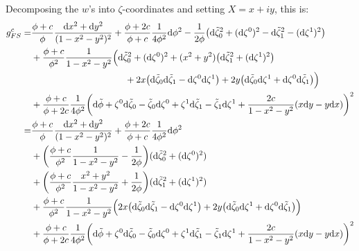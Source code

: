 Decomposing the $w$'s into $\zeta$-coordinates and setting $X=x+iy$, this is:
\begin{align*}
	g_{FS}^c=&\frac{\phi+c}{\phi}\frac{\d x^2+\d y^2}{(1-x^2-y^2)^2} 
	+ \frac{\phi+2c}{\phi+c}\frac{1}{4\phi^2}\d \phi^2
	-\frac{1}{2\phi} \big(\d \tilde\zeta_0^2+ (\d \zeta^0)^2 - \d \tilde \zeta_1^2 - (\d \zeta^1)^2\big)\\
	&+\frac{\phi+c}{\phi^2}\frac{1}{1-x^2-y^2}\Big(\d \tilde\zeta_0^2+(\d \zeta^0)^2
	+(x^2+y^2)\big(\d \tilde\zeta_1^2+(\d \zeta^1)^2\big)\\
	&\hspace{3.6cm}+2x \big(\d \tilde\zeta_0\d \tilde\zeta_1 - \d \zeta^0 \d \zeta^1 \big) 
	+2y \big(\d \tilde\zeta_0 \d \zeta^1 + \d \zeta^0\d \tilde\zeta_1 \big) \Big)\\
	&+\frac{\phi+c}{\phi+2c}\frac{1}{4\phi^2}\bigg(\d \tilde{\phi}+\zeta^0 \d \tilde{\zeta}_0 -\tilde{\zeta}_0 \d \zeta^0
	+\zeta^1 \d \tilde{\zeta}_1 -\tilde{\zeta}_1 \d \zeta^1+\frac{2c}{1-x^2-y^2}(x\d y-y \d x)\bigg)^2\\
	=&\frac{\phi+c}{\phi}\frac{\d x^2+\d y^2}{(1-x^2-y^2)^2} 
	+ \frac{\phi+2c}{\phi+c}\frac{1}{4\phi^2}\d \phi^2\\
	&+\bigg(\frac{\phi+c}{\phi^2}\frac{1}{1-x^2-y^2}-\frac{1}{2\phi}\bigg) (\d \tilde\zeta_0^2+(\d \zeta^0)^2)\\
	&+\bigg(\frac{\phi+c}{\phi^2}\frac{x^2+y^2}{1-x^2-y^2}+\frac{1}{2\phi}\bigg) (\d \tilde\zeta_1^2+(\d \zeta^1)^2)\\
	&+\frac{\phi+c}{\phi^2}\frac{1}{1-x^2-y^2}
	\Big(2x \big(\d \tilde\zeta_0\d \tilde\zeta_1 - \d \zeta^0 \d \zeta^1 \big) 
	+2y \big(\d \tilde\zeta_0 \d \zeta^1 + \d \zeta^0\d \tilde\zeta_1 \big) \Big)\\
	&+\frac{\phi+c}{\phi+2c}\frac{1}{4\phi^2}\bigg(\d \tilde{\phi}+\zeta^0 \d \tilde{\zeta}_0 -\tilde{\zeta}_0 \d \zeta^0
	+\zeta^1 \d \tilde{\zeta}_1 -\tilde{\zeta}_1 \d \zeta^1+\frac{2c}{1-x^2-y^2}(x\d y-y \d x)\bigg)^2
\end{align*}



